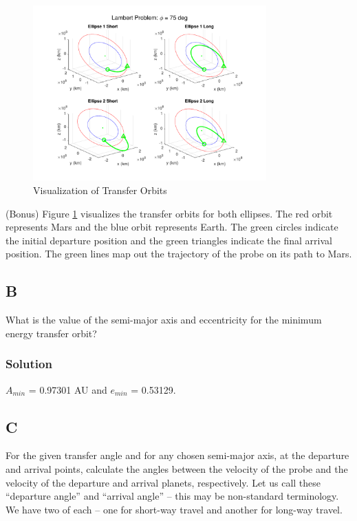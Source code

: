 \documentclass[conf]{new-aiaa}
\begin{document}
\begin{figure}[H]
	\centering 
	\includegraphics[width=0.8\textwidth]{orbits_Ellipse 1 and 2, Short and Long.pdf}
	\caption{Visualization of Transfer Orbits}
	\label{fig:transfer_orbits}
\end{figure}

(Bonus) Figure \ref{fig:transfer_orbits} visualizes the transfer orbits for both ellipses. The red orbit represents Mars and the blue orbit represents Earth. The green circles indicate the initial departure position and the green triangles indicate the final arrival position. The green lines map out the trajectory of the probe on its path to Mars. 

\subsection*{B}
What is the value of the semi-major axis and eccentricity for the minimum energy
transfer orbit?

\subsubsection*{Solution}

$A_{min}$ = 0.97301 AU and $e_{min}$ = 0.53129. 

\subsection*{C}
For the given transfer angle and for any chosen semi-major axis, at the departure
and arrival points, calculate the angles between the velocity of the probe and the
velocity of the departure and arrival planets, respectively. Let us call these
“departure angle” and “arrival angle” – this may be non-standard terminology.
We have two of each – one for short-way travel and another for long-way travel.
\end{document}
